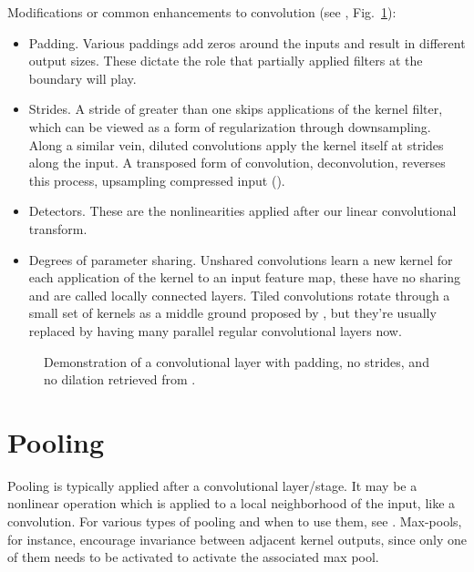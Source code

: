 \documentclass{article}
\begin{document}
Modifications or common enhancements to convolution (see , Fig.~\ref{fig:conv}):
\begin{itemize}
\item Padding. Various paddings add zeros around the inputs and result in different output sizes. These dictate the role that partially applied filters at the boundary will play.
\item Strides. A stride of greater than one skips applications of the kernel filter, which can be viewed as a form of regularization through downsampling. Along a similar vein, diluted convolutions apply the kernel itself at strides along the input. A transposed form of convolution, deconvolution, reverses this process, upsampling compressed input ().
\item Detectors. These are the nonlinearities applied after our linear convolutional transform.
\item Degrees of parameter sharing. Unshared convolutions learn a new kernel for each application of the kernel to an input feature map, these have no sharing and are called locally connected layers. Tiled convolutions rotate through a small set of kernels as a middle ground proposed by , but they're usually replaced by having many parallel regular convolutional layers now.
\end{itemize}


\begin{figure}[!h]
\centering
{}
\caption{Demonstration of a convolutional layer with padding, no strides, and no dilation retrieved from .}
\label{fig:conv}
\end{figure}

\begin{center}

\end{center}

\section{Pooling}

Pooling is typically applied after a convolutional layer/stage. It may be a nonlinear operation which is applied to a local neighborhood of the input, like a convolution. For various types of pooling and when to use them, see . Max-pools, for instance, encourage invariance between adjacent kernel outputs, since only one of them needs to be activated to activate the associated max pool.
\end{document}
